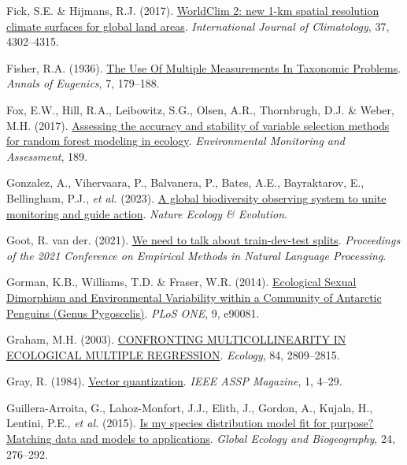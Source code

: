 \documentclass[
  letterpaper,
]{scrbook}
\newlength{\cslhangindent}
\newenvironment{CSLReferences}[2] %
 {\begin{list}{}{%
  \setlength{\itemindent}{0pt}
  \setlength{\leftmargin}{0pt}
  \setlength{\parsep}{0pt}
  \ifodd #1
   \setlength{\leftmargin}{\cslhangindent}
   \setlength{\itemindent}{-1\cslhangindent}
  \fi
  \setlength{\itemsep}{#2\baselineskip}}}
 {\end{list}}
\begin{document}
\begin{CSLReferences}{1}{0}
Fick, S.E. \& Hijmans, R.J. (2017).
\href{https://doi.org/10.1002/joc.5086}{WorldClim 2: new 1{-}km spatial
resolution climate surfaces for global land areas}. \emph{International
Journal of Climatology}, 37, 4302--4315.

Fisher, R.A. (1936).
\href{https://doi.org/10.1111/j.1469-1809.1936.tb02137.x}{The Use Of
Multiple Measurements In Taxonomic Problems}. \emph{Annals of Eugenics},
7, 179--188.

Fox, E.W., Hill, R.A., Leibowitz, S.G., Olsen, A.R., Thornbrugh, D.J. \&
Weber, M.H. (2017).
\href{https://doi.org/10.1007/s10661-017-6025-0}{Assessing the accuracy
and stability of variable selection methods for random forest modeling
in ecology}. \emph{Environmental Monitoring and Assessment}, 189.

Gonzalez, A., Vihervaara, P., Balvanera, P., Bates, A.E., Bayraktarov,
E., Bellingham, P.J., \emph{et al.} (2023).
\href{https://doi.org/10.1038/s41559-023-02171-0}{A global biodiversity
observing system to unite monitoring and guide action}. \emph{Nature
Ecology \& Evolution}.

Goot, R. van der. (2021).
\href{https://doi.org/10.18653/v1/2021.emnlp-main.368}{We need to talk
about train-dev-test splits}. \emph{Proceedings of the 2021 Conference
on Empirical Methods in Natural Language Processing}.

Gorman, K.B., Williams, T.D. \& Fraser, W.R. (2014).
\href{https://doi.org/10.1371/journal.pone.0090081}{Ecological Sexual
Dimorphism and Environmental Variability within a Community of Antarctic
Penguins (Genus Pygoscelis)}. \emph{PLoS ONE}, 9, e90081.

Graham, M.H. (2003). \href{https://doi.org/10.1890/02-3114}{CONFRONTING
MULTICOLLINEARITY IN ECOLOGICAL MULTIPLE REGRESSION}. \emph{Ecology},
84, 2809--2815.

Gray, R. (1984).
\href{https://doi.org/10.1109/massp.1984.1162229}{Vector quantization}.
\emph{IEEE ASSP Magazine}, 1, 4--29.

Guillera-Arroita, G., Lahoz-Monfort, J.J., Elith, J., Gordon, A.,
Kujala, H., Lentini, P.E., \emph{et al.} (2015).
\href{https://doi.org/10.1111/geb.12268}{Is my species distribution
model fit for purpose? Matching data and models to applications}.
\emph{Global Ecology and Biogeography}, 24, 276--292.


\end{CSLReferences}
\end{document}
